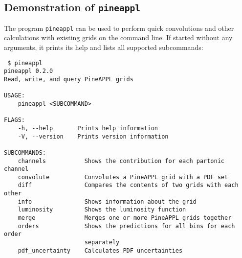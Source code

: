 \subsection{Demonstration of \texorpdfstring{\texttt{pineappl}}{pineappl}}
\label{app:pineappl-demo}

The program \texttt{pineappl} can be used to perform quick convolutions and other calculations with existing grids on the command line.
If started without any arguments, it prints its help and lists all supported subcommands:
\begin{verbatim}
 $ pineappl
pineappl 0.2.0
Read, write, and query PineAPPL grids

USAGE:
    pineappl <SUBCOMMAND>

FLAGS:
    -h, --help       Prints help information
    -V, --version    Prints version information

SUBCOMMANDS:
    channels           Shows the contribution for each partonic channel
    convolute          Convolutes a PineAPPL grid with a PDF set
    diff               Compares the contents of two grids with each other
    info               Shows information about the grid
    luminosity         Shows the luminosity function
    merge              Merges one or more PineAPPL grids together
    orders             Shows the predictions for all bins for each order
                       separately
    pdf_uncertainty    Calculates PDF uncertainties
\end{verbatim}


